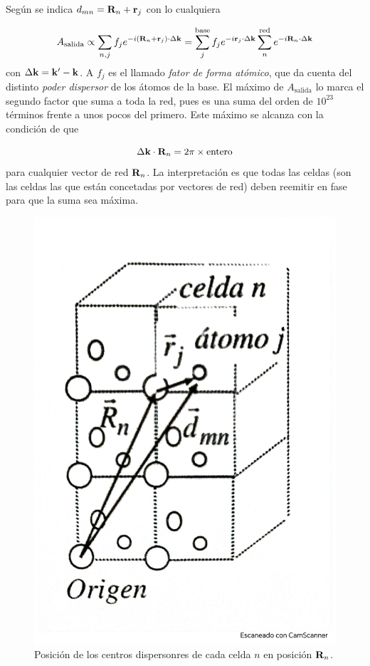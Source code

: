 Según se indica $\mathbf{}d_{mn}=\mathbf{R}_n+\mathbf{r}_j$ con lo cualquiera

\begin{equation}
    A_{\text{salida}} \propto  \sum_{n,j} f_j e^{-i (\mathbf{R}_n + \mathbf{r}_j) \cdot \Delta \mathbf{k}} = \sum_j^{\text{base}} f_j e^{-i \mathbf{r}_j \cdot \Delta \mathbf{k}} \sum_{n}^{\text{red}} e^{-i\mathbf{R}_n \cdot \Delta \mathbf{k}} \label{Ec:02-02-02}
\end{equation}
con $\Delta \mathbf{k} = \mathbf{k}' - \mathbf{k}$. A $f_j$ es el llamado \textit{fator de forma atómico}, que da cuenta del distinto \textit{poder dispersor} de los átomos de la base. El máximo de $A_{\text{salida}}$ lo marca el segundo factor que suma a toda la red, pues es una suma del orden de $10^{23}$ términos frente a unos pocos del primero. Este máximo se alcanza con la condición de que

\begin{equation}
    \Delta \mathbf{k} \cdot \mathbf{R}_n = 2 \pi \times \text{entero} \label{Ec:02-02-03}
\end{equation}
para cualquier vector de red $\mathbf{R}_n$. La interpretación es que todas las celdas (son las celdas las que están concetadas por vectores de red) deben reemitir en fase para que la suma sea máxima.

    
\begin{figure}[h!] \centering
    \includegraphics[scale=0.30]{Cuerpo/Ch_02/Fotos_libro 3.pdf}
    \caption{Posición de los centros dispersonres de cada celda $n$ en posición $\mathbf{R}_n$.}
    \label{Fig:02-03}
\end{figure}



